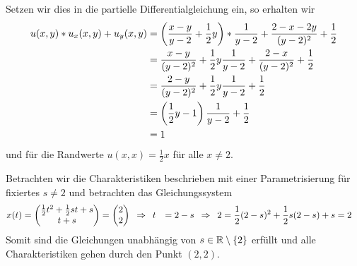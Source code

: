 \begin{exercisePage}
	Setzen wir dies in die partielle Differentialgleichung ein, so erhalten wir
	\begin{equation*}
		\begin{aligned}
			u(x,y) * u_x(x,y) + u_y(x,y) &= \left( \frac{x-y}{y - 2} + \frac{1}{2} y \right) * \frac{1}{y-2} + \frac{2-x-2y}{(y-2)^2} + \frac{1}{2} \\
			&= \frac{x-y}{(y-2)^2} + \frac{1}{2} y \frac{1}{y-2} + \frac{2-x}{(y-2)^2} + \frac{1}{2} \\
			&= \frac{2-y}{(y-2)^2} + \frac{1}{2} y \frac{1}{y-2} + \frac{1}{2} \\
			&= \left( \frac{1}{2} y - 1 \right) \frac{1}{y-2} + \frac{1}{2} \\
			&= 1
		\end{aligned}
	\end{equation*}
	und für die Randwerte $u(x,x) = \frac{1}{2} x$ für alle $x \neq 2$.
	
	Betrachten wir die Charakteristiken beschrieben mit einer Parametrisierung für fixiertes $s \neq 2$ und betrachten das Gleichungssystem
	\begin{equation*}
		\begin{aligned}
			x(t) &= \begin{pmatrix} \frac{1}{2} t^2 + \frac{1}{2} s t + s \\ t + s \end{pmatrix} 
			= \begin{pmatrix} 2 \\ 2 \end{pmatrix} 
			\enskip \Rightarrow \enskip t &= 2 - s
			\enskip \Rightarrow \enskip 2 &= \frac{1}{2} (2-s)^2 + \frac{1}{2} s (2-s) + s = 2
		\end{aligned}
	\end{equation*}
	Somit sind die Gleichungen unabhängig von $s \in \mathbb{R} \setminus \left\{ 2 \right\}$ erfüllt und alle Charakteristiken gehen durch den Punkt $(2,2)$.  
	
		

\end{exercisePage}
